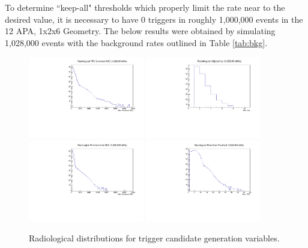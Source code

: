 \documentclass[10pt]{article}
\begin{document}
To determine ``keep-all" thresholds which properly limit the rate near to the desired value, it is necessary to have 0 triggers in roughly 1,000,000 events in the 12 APA, 1x2x6 Geometry. The below results were obtained by simulating 1,028,000 events with the background rates outlined in Table \ref{tab:bkg}.

\begin{figure}[H]
    \centering
    \includegraphics[angle=270,width=0.45\textwidth]{Rads/rads_TADC.pdf}
    \includegraphics[angle=270,width=0.45\textwidth]{Rads/rads_max_adj_log.pdf}
    \includegraphics[angle=270,width=0.45\textwidth]{Rads/rads_WADC.pdf}
    \includegraphics[angle=270,width=0.45\textwidth]{Rads/rads_TOT_log.pdf}
    \caption{Radiological distributions for trigger candidate generation variables.}
    \label{fig:eff_atm}
\end{figure}
\end{document}
